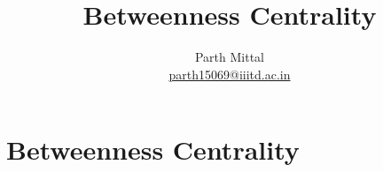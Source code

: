 \documentclass{article}
\title{Betweenness Centrality}
\author{Parth Mittal \\
		\href{mailto:parth15069@iiitd.ac.in}{parth15069@iiitd.ac.in}}
\begin{document}
\maketitle


\section{Betweenness Centrality}






\end{document}
